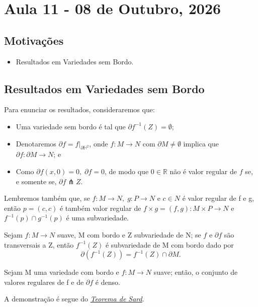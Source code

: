 \documentclass[../differential_topology.tex]{subfiles}
\begin{document}
\section{Aula 11 - 08 de Outubro, 2026}
\subsection{Motivações}
\begin{itemize}
	\item Resultados em Variedades sem Bordo.
\end{itemize}
\subsection{Resultados em Variedades sem Bordo}
Para enunciar os resultados, consideraremos que:
\begin{itemize}
	\item Uma variedade sem bordo é tal que \(\partial f^{-1}(Z)=\emptyset \);
	\item Denotaremos \(\partial f = f|_{\partial \mathbb{H}^{2}}\), onde \(f:M\rightarrow N\) com \(\partial M \neq\emptyset\) implica que \(\partial f:\partial M\rightarrow N\); e
	\item Como \(\partial f(x, 0) = 0,\; \partial f=0\), de modo que \(0\in \mathbb{R}\) não é valor regular de \(f\) se, e somente se, \(\partial f \pitchfork Z\).
\end{itemize}
Lembremos também que, se \(f:M\rightarrow N,\; g:P\rightarrow N\) e \(c\in N\) é valor regular de f e g, então \(p=(c, c)\) é também valor regular de \(f\times g = (f, g):M\times P\rightarrow N\) e \(f^{-1}(p)\cap g^{-1}(p)\) é uma subvariedade.

\begin{theorem*}
	Sejam \(f:M\rightarrow N\) suave, M com bordo e Z subvariedade de N; se \(f\) e \(\partial f\) são transversais a Z, então \(f^{-1}(Z)\) é subvariedade de M com bordo dado por
	\[
		\partial (f^{-1}(Z)) = f^{-1}(Z)\cap \partial M.
	\]
\end{theorem*}

\begin{theorem*}
	Sejam M uma variedade com bordo e \(f:M\rightarrow N\) suave; então, o conjunto de valores regulares de f e de \(\partial f\) é denso.
\end{theorem*}
A demonstração é segue do \hyperlink{sard_theorem}{\textit{Teorema de Sard}}.
\end{document}
